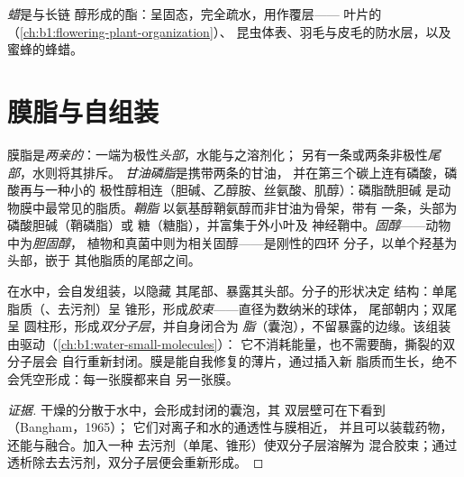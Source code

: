\begin{definition}[蜡]\label{def:b1:lipids:wax}
\emph{蜡}是与长链
醇形成的酯：呈固态，完全疏水，用作覆层——
叶片的（\cref{ch:b1:flowering-plant-organization}）、
昆虫体表、羽毛与皮毛的防水层，以及
蜜蜂的蜂蜡。
\end{definition}

\section{膜脂与自组装}

\begin{definition}[两亲脂质]\label{def:b1:lipids:amphiphilic}
膜脂是\emph{两亲的}：一端为极性\emph{头部}，水能与之溶剂化；
另有一条或两条非极性\emph{尾部}，水则将其排斥。
\emph{甘油磷脂}是携带两条的甘油，
并在第三个碳上连有磷酸，磷酸再与一种小的
极性醇相连（胆碱、乙醇胺、丝氨酸、肌醇）：磷脂酰胆碱
是动物膜中最常见的脂质。\emph{鞘脂}
以氨基醇鞘氨醇而非甘油为骨架，带有
一条，头部为磷酸胆碱（鞘磷脂）或
糖（糖脂），并富集于外小叶及
神经鞘中。\emph{固醇}——动物中为\emph{胆固醇}，
植物和真菌中则为相关固醇——是刚性的四环
分子，以单个羟基为头部，嵌于
其他脂质的尾部之间。
\end{definition}

\begin{proposition}[自组装]\label{prop:b1:lipids:selfassembly}
在水中，会自发组装，以隐藏
其尾部、暴露其头部。分子的形状决定
结构：单尾脂质（、去污剂）呈
锥形，形成\emph{胶束}——直径为数纳米的球体，
尾部朝内；双尾呈
圆柱形，形成\emph{双分子层}，并自身闭合为
\emph{脂}（囊泡），不留暴露的边缘。该组装
由驱动（\cref{ch:b1:water-small-molecules}）：
它不消耗能量，也不需要酶，撕裂的双分子层会
自行重新封闭。膜是能自我修复的薄片，通过插入新
脂质而生长，绝不会凭空形成：每一张膜都来自
另一张膜。
\end{proposition}
\begin{proof}[证据]
干燥的分散于水中，会形成封闭的囊泡，其
双层壁可在下看到（Bangham，1965）；
它们对离子和水的通透性与膜相近，
并且可以装载药物，还能与融合。加入一种
去污剂（单尾、锥形）使双分子层溶解为
混合胶束；通过透析除去去污剂，双分子层便会重新形成。
\end{proof}


